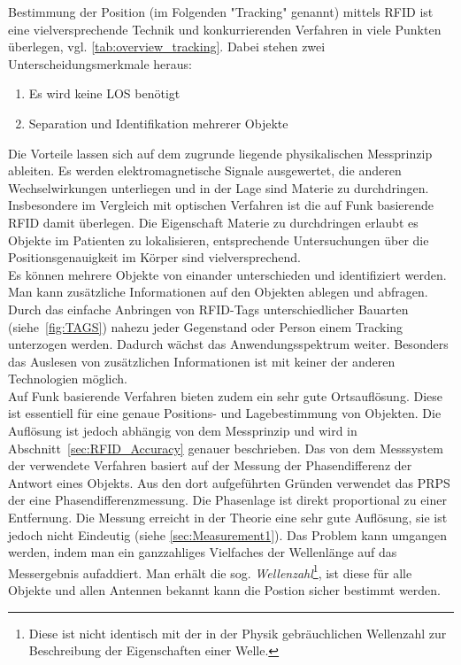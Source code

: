 Bestimmung der Position (im Folgenden "Tracking" genannt) mittels RFID ist eine vielversprechende Technik und konkurrierenden Verfahren in viele Punkten überlegen, vgl. \ref{tab:overview_tracking}. Dabei stehen zwei Unterscheidungsmerkmale heraus:
%
\begin{enumerate}
	\item Es wird keine LOS benötigt
	\item Separation und Identifikation mehrerer Objekte
\end{enumerate}
%
Die Vorteile lassen sich auf dem zugrunde liegende physikalischen Messprinzip ableiten. Es werden elektromagnetische Signale ausgewertet, die anderen Wechselwirkungen unterliegen und in der Lage sind Materie zu durchdringen. Insbesondere im Vergleich mit optischen Verfahren ist die auf Funk basierende RFID damit überlegen. Die Eigenschaft Materie zu durchdringen erlaubt es Objekte im Patienten zu lokalisieren, entsprechende Untersuchungen über die Positionsgenauigkeit im Körper sind vielversprechend.~\cite{Knipscheer1}\\

Es können mehrere Objekte von einander unterschieden und identifiziert werden. Man kann zusätzliche Informationen auf den Objekten ablegen und abfragen. Durch das einfache Anbringen von RFID-Tags unterschiedlicher Bauarten (siehe~\ref{fig:TAGS}) nahezu jeder Gegenstand oder Person einem Tracking unterzogen werden. Dadurch wächst das Anwendungsspektrum weiter. Besonders das Auslesen von zusätzlichen Informationen ist mit keiner der anderen Technologien möglich.\\

Auf Funk basierende Verfahren bieten zudem ein sehr gute Ortsauflösung. Diese ist essentiell für eine genaue Positions- und Lagebestimmung von Objekten. Die Auflösung ist jedoch abhängig von dem Messprinzip und wird in Abschnitt~\ref{sec:RFID_Accuracy} genauer beschrieben. 
Das von dem Messsystem der \amedogmbh verwendete Verfahren basiert auf der Messung der Phasendifferenz der Antwort eines Objekts. Aus den dort aufgeführten Gründen verwendet das PRPS der \amedogmbh eine Phasendifferenzmessung. Die Phasenlage ist direkt proportional zu einer Entfernung. Die Messung erreicht in der Theorie eine sehr gute Auflösung, sie ist jedoch nicht Eindeutig (siehe \ref{sec:Measurement1}). Das Problem kann umgangen werden, indem man ein ganzzahliges Vielfaches der Wellenlänge auf das Messergebnis aufaddiert. Man erhält die sog. \textit{Wellenzahl}\footnote{Diese ist nicht identisch mit der in der Physik gebräuchlichen Wellenzahl zur Beschreibung der Eigenschaften einer Welle.}, ist diese für alle Objekte und allen Antennen bekannt kann die Postion sicher bestimmt werden.\\

